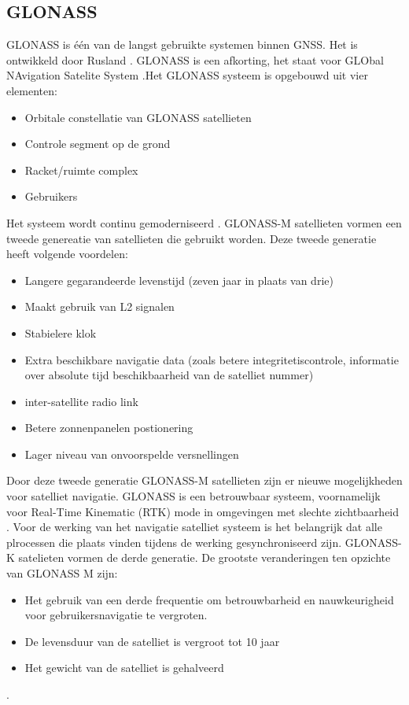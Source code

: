 \subsection{GLONASS}
\label{LGLO}
GLONASS is \'e\'en van de langst gebruikte systemen binnen GNSS. Het is ontwikkeld door Rusland \cite{LBibGLONASS2}. GLONASS is een afkorting, het staat voor GLObal NAvigation Satelite System \cite{LBibBeiDou}.Het GLONASS systeem is opgebouwd uit vier elementen:
\begin{itemize}
	\item Orbitale constellatie van GLONASS satellieten
	\item Controle segment op de grond
	\item Racket/ruimte complex
	\item Gebruikers
\end{itemize} \cite{LBibGLONASS2} Het systeem wordt continu gemoderniseerd \cite{LBibGNSS4}. GLONASS-M satellieten vormen een tweede genereatie van satellieten die gebruikt worden. Deze tweede generatie heeft volgende voordelen:
\begin{itemize}
	\item Langere gegarandeerde levenstijd (zeven jaar in plaats van drie)
	\item Maakt gebruik van L2 signalen
	\item Stabielere klok
	\item Extra beschikbare navigatie data (zoals betere integritetiscontrole, informatie over absolute tijd beschikbaarheid van de satelliet nummer)
	\item inter-satellite radio link
	\item Betere zonnenpanelen postionering
	\item Lager niveau van onvoorspelde versnellingen
\end{itemize}
Door deze tweede generatie GLONASS-M satellieten zijn er nieuwe mogelijkheden voor satelliet navigatie. GLONASS is een betrouwbaar systeem, voornamelijk voor Real-Time Kinematic (RTK) mode in omgevingen met slechte zichtbaarheid \cite{LBibGLONASS}. Voor de werking van het navigatie satelliet systeem is het belangrijk dat alle plrocessen die plaats vinden tijdens de werking gesynchroniseerd zijn. GLONASS-K satelieten vormen de derde generatie. De grootste veranderingen ten opzichte van GLONASS M zijn:
\begin{itemize}
	\item Het gebruik van een derde frequentie om betrouwbarheid en nauwkeurigheid voor gebruikersnavigatie te vergroten.
	\item De levensduur van de satelliet is vergroot tot 10 jaar
	\item Het gewicht van de satelliet is gehalveerd
\end{itemize}\cite{LBibGLONASS2}.

